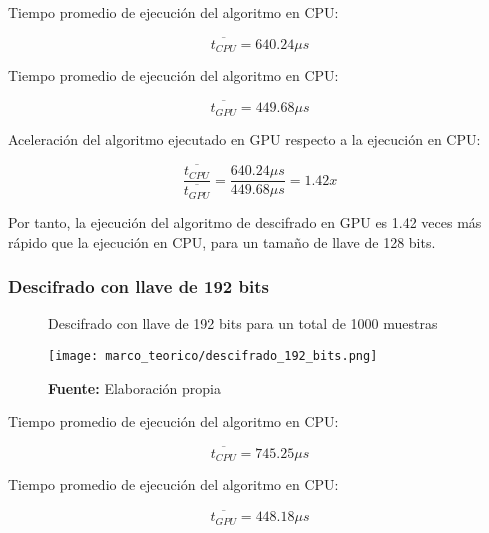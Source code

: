 \documentclass[../main/main.tex]{subfiles}
\begin{document}
        Tiempo promedio de ejecución del algoritmo en CPU:

        \vspace{-0.7cm}\begin{equation}
          \overline{t_{CPU}} = 640.24\mu s
        \end{equation}

        Tiempo promedio de ejecución del algoritmo en CPU:

        \vspace{-0.7cm}\begin{equation}
          \overline{t_{GPU}} = 449.68\mu s
        \end{equation}

        Aceleración del algoritmo ejecutado en GPU respecto a la ejecución en CPU:

        \vspace{-0.7cm}\begin{equation}
          \frac{\overline{t_{CPU}}}{\overline{t_{GPU}}} = \frac{640.24\mu s}{449.68\mu s} = 1.42x
        \end{equation}

        Por tanto, la ejecución del algoritmo de descifrado en GPU es 1.42 veces más rápido que la ejecución en CPU, para un tamaño de llave de 128 bits.

      \subsubsection{Descifrado con llave de 192 bits}

        \begin{figure}[H]
          \centering
          \caption{Descifrado con llave de 192 bits para un total de 1000 muestras}
          \texttt{[image: marco\_teorico/descifrado\_192\_bits.png]}
          \caption*{\textbf{Fuente:} Elaboración propia}
        \end{figure}

        Tiempo promedio de ejecución del algoritmo en CPU:

        \vspace{-0.7cm}\begin{equation}
          \overline{t_{CPU}} = 745.25\mu s
        \end{equation}

        Tiempo promedio de ejecución del algoritmo en CPU:

        \vspace{-0.7cm}\begin{equation}
          \overline{t_{GPU}} = 448.18\mu s
        \end{equation}
\end{document}
